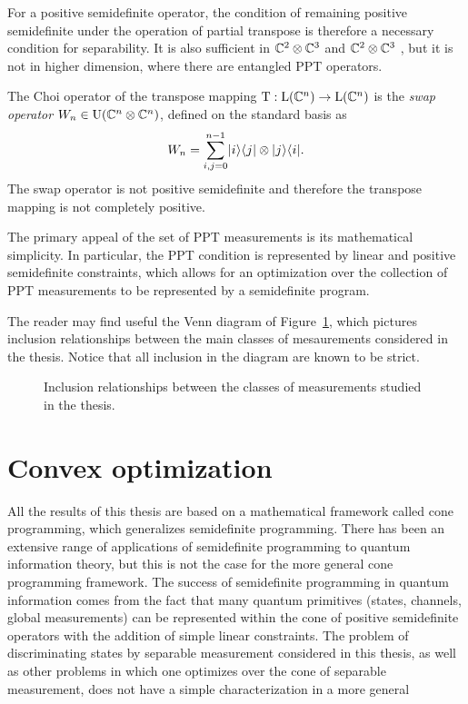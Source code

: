 For a positive semidefinite operator, the condition of remaining positive semidefinite under 
the operation of partial transpose is therefore a necessary condition for separability. 
It is also sufficient in $\mathbb{C}^{2}\otimes\mathbb{C}^{3}$ and 
$\mathbb{C}^{2}\otimes\mathbb{C}^{3}$ \cite{Peres1996,Horodecki1996}, 
but it is not in higher dimension, where there are entangled PPT operators. 

The Choi operator of the transpose mapping $\operatorname{T} : \mathrm{L}(\mathbb{C}^{n})\to\mathrm{L}(\mathbb{C}^{n})$
is the \emph{swap operator} 
$W_{n} \in \mathrm{U}(\mathbb{C}^{n}\otimes\mathbb{C}^{n})$, defined on the standard basis as
\begin{equation}
\label{eq:swap-operator}
  W_{n} = \sum_{i,j=0}^{n-1}\lvert\mspace{0.5mu} i \mspace{0.5mu} \rangle\langle\mspace{0.5mu} j \mspace{0.5mu} \rvert\otimes\lvert\mspace{0.5mu} j \mspace{0.5mu} \rangle\langle\mspace{0.5mu} i \mspace{0.5mu} \rvert.
\end{equation}
The swap operator is not positive semidefinite and therefore the transpose
mapping is not completely positive.

The primary appeal of the set of PPT measurements is its mathematical simplicity.
In particular, the PPT condition is represented by linear and positive
semidefinite constraints, which allows for an optimization over the collection
of PPT measurements to be represented by a semidefinite program.

The reader may find useful the Venn diagram of Figure~\ref{fig:classes-measurements}, 
which pictures inclusion relationships between the main classes of mesaurements
considered in the thesis. Notice that all inclusion in the diagram are known
to be strict.

\begin{figure}[!ht]
  \centering
    \def\svgwidth{200pt}
    \scalebox{.75}{}
    \caption{Inclusion relationships between the classes of measurements studied 
      in the thesis.}
    \label{fig:classes-measurements}
\end{figure}

\section{Convex optimization}
\label{sec:convex-optimization}

All the results of this thesis are based on a mathematical framework 
called cone programming, which generalizes semidefinite programming.
There has been an extensive range of applications of semidefinite programming
to quantum information theory, but this is not the case for  
the more general cone programming framework. 
The success of semidefinite programming in quantum information comes from the fact 
that many quantum primitives (states, channels, global measurements) 
can be represented within the cone of positive semidefinite operators with the addition of 
simple linear constraints. 
The problem of discriminating states by separable measurement considered in this thesis, 
as well as other problems in which one optimizes over the cone of separable measurement,
does not have a simple characterization in a more general 


